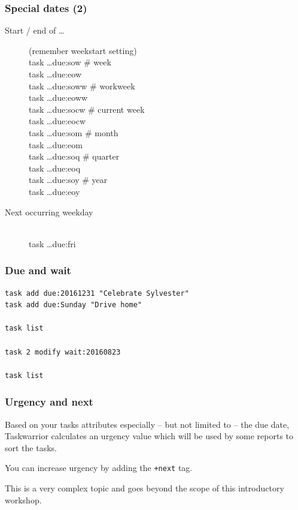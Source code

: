 \documentclass[t]{beamer}
\begin{document}
\begin{frame}[fragile]\frametitle{Special dates (2)}
    \begin{description}
        \item[Start / end of \ldots] (remember weekstart setting) \hfill \\
            task \ldots due:sow \# week \\
            task \ldots due:eow \\
            task \ldots due:soww \# workweek \\
            task \ldots due:eoww \\
            task \ldots due:socw \# current week \\
            task \ldots due:eocw \\
            task \ldots due:som \# month \\
            task \ldots due:eom \\
            task \ldots due:soq \# quarter \\
            task \ldots due:eoq \\
            task \ldots due:soy \# year \\
            task \ldots due:eoy \\
        \item[Next occurring weekday] \hfill \\
            task \ldots due:fri
    \end{description}
\end{frame}

\begin{frame}[fragile]\frametitle{Due and wait}
    \vfill
    \begin{lstlisting}
task add due:20161231 "Celebrate Sylvester"
task add due:Sunday "Drive home"

task list

task 2 modify wait:20160823

task list\end{lstlisting}
\end{frame}

\begin{frame}[fragile]\frametitle{Urgency and next}
    \vfill
    Based on your tasks attributes especially -- but not limited to -- the due date, Taskwarrior calculates an urgency value which will be used by some reports to sort the tasks.

    You can increase urgency by adding the \verb=+next= tag.

    This is a very complex topic and goes beyond the scope of this introductory workshop.
\end{frame}
\end{document}
